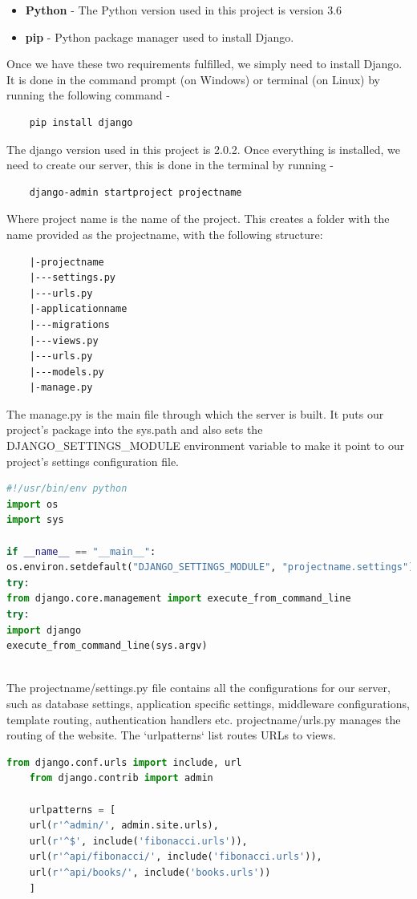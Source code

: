 \documentclass[../thesis.tex]{subfiles}
\begin{document}
	\begin{itemize}
		\item \textbf{Python} - The Python version used in this project is version 3.6
		\smallskip
		\item \textbf{pip} - Python package manager used to install Django.
	\end{itemize}
	Once we have these two requirements fulfilled, we simply need to install Django. It is done in the command prompt (on Windows) or terminal (on Linux) by running the following command -
	\begin{verbatim}
	pip install django
	\end{verbatim}
	The django version used in this project is 2.0.2.
	Once everything is installed, we need to create our server, this is done in the terminal by running - 
	\begin{verbatim}
	django-admin startproject projectname
	\end{verbatim}
	Where project name is the name of the project. This creates a folder with the name provided as the projectname, with the following structure:
	\begin{verbatim}
	|-projectname
	|---settings.py
	|---urls.py
	|-applicationname
	|---migrations
	|---views.py
	|---urls.py
	|---models.py
	|-manage.py
	\end{verbatim}
	The manage.py is the main file through which the server is built. It puts our project's package into the sys.path and also sets the DJANGO\_SETTINGS\_MODULE environment variable to make it point to our project's settings configuration file.
	\begin{lstlisting}[language=Python, caption=Django project configuration file]
#!/usr/bin/env python
import os
import sys

if __name__ == "__main__":
os.environ.setdefault("DJANGO_SETTINGS_MODULE", "projectname.settings")
try:
from django.core.management import execute_from_command_line
try:
import django
execute_from_command_line(sys.argv)
	
	\end{lstlisting}
	The projectname/settings.py file contains all the configurations for our server, such as database settings, application specific settings, middleware configurations, template routing, authentication handlers etc. projectname/urls.py manages the routing of the website. The `urlpatterns` list routes URLs to views.
	\begin{lstlisting}[language=Python, caption=Django project routing configuration]
	from django.conf.urls import include, url
	from django.contrib import admin
	
	urlpatterns = [
	url(r'^admin/', admin.site.urls),
	url(r'^$', include('fibonacci.urls')),
	url(r'^api/fibonacci/', include('fibonacci.urls')),
	url(r'^api/books/', include('books.urls'))
	]	
	\end{lstlisting}
\end{document}
